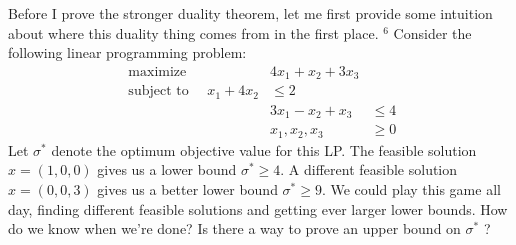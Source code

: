 

Before I prove the stronger duality theorem, let me first provide some intuition about where this duality thing comes from in the first place. ${ }^{6}$ Consider the following linear programming problem:
\begin{align*}
\text { maximize } & 
4 x_{1}+x_{2}+3 x_{3} \\
\text { subject to } \quad x_{1}+4 x_{2} & \leq 2 \\
& 3 x_{1}-x_{2}+x_{3} & \leq 4 \\
& x_{1}, x_{2}, x_{3} & \geq 0
\end{align*}
Let $\sigma^{*}$ denote the optimum objective value for this LP. The feasible solution $x=(1,0,0)$ gives us a lower bound $\sigma^{*} \geq 4$. A different feasible solution $x=(0,0,3)$ gives us a better lower bound $\sigma^{*} \geq 9$. We could play this game all day, finding different feasible solutions and getting ever larger lower bounds. How do we know when we're done? Is there a way to prove an upper bound on $\sigma^{*}$ ?

